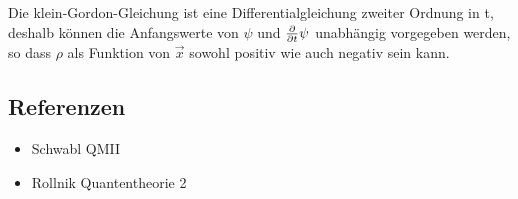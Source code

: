 Die klein-Gordon-Gleichung ist eine Differentialgleichung zweiter Ordnung in t, deshalb können die Anfangswerte von \(\psi\) und \(\pdiff_t\psi\) unabhängig vorgegeben werden, so dass \(\rho\) als Funktion von \(\vec x\) sowohl positiv wie auch negativ sein kann. 




\subsection*{Referenzen}
\begin{itemize}
\item Schwabl QMII
\item Rollnik Quantentheorie 2
\end{itemize}



